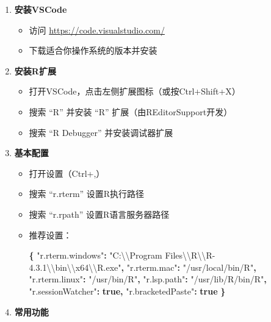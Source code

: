 \documentclass[
  twoside]{book}
\newenvironment{Shaded}{\begin{snugshade}}{\end{snugshade}}
\newcommand{\CharTok}[1]{\textcolor[rgb]{0.31,0.60,0.02}{#1}}
\newcommand{\DataTypeTok}[1]{\textcolor[rgb]{0.13,0.29,0.53}{#1}}
\newcommand{\FunctionTok}[1]{\textcolor[rgb]{0.13,0.29,0.53}{\textbf{#1}}}
\newcommand{\KeywordTok}[1]{\textcolor[rgb]{0.13,0.29,0.53}{\textbf{#1}}}
\newcommand{\StringTok}[1]{\textcolor[rgb]{0.31,0.60,0.02}{#1}}
\providecommand{\tightlist}{%
  \setlength{\itemsep}{0pt}\setlength{\parskip}{0pt}}
\begin{document}
\begin{enumerate}
\def\labelenumi{\arabic{enumi}.}
\tightlist
\item
  \textbf{安装VSCode}

  \begin{itemize}
  \tightlist
  \item
    访问 \url{https://code.visualstudio.com/}
  \item
    下载适合你操作系统的版本并安装
  \end{itemize}
\item
  \textbf{安装R扩展}

  \begin{itemize}
  \tightlist
  \item
    打开VSCode，点击左侧扩展图标（或按Ctrl+Shift+X）
  \item
    搜索 ``R'' 并安装 ``R'' 扩展（由REditorSupport开发）
  \item
    搜索 ``R Debugger'' 并安装调试器扩展
  \end{itemize}
\item
  \textbf{基本配置}

  \begin{itemize}
  \item
    打开设置（Ctrl+,）
  \item
    搜索 ``r.rterm'' 设置R执行路径
  \item
    搜索 ``r.rpath'' 设置R语言服务器路径
  \item
    推荐设置：

\begin{Shaded}
\begin{Highlighting}[]
\FunctionTok{\{}
  \DataTypeTok{"r.rterm.windows"}\FunctionTok{:} \StringTok{"C:}\CharTok{\textbackslash{}\textbackslash{}}\StringTok{Program Files}\CharTok{\textbackslash{}\textbackslash{}}\StringTok{R}\CharTok{\textbackslash{}\textbackslash{}}\StringTok{R{-}4.3.1}\CharTok{\textbackslash{}\textbackslash{}}\StringTok{bin}\CharTok{\textbackslash{}\textbackslash{}}\StringTok{x64}\CharTok{\textbackslash{}\textbackslash{}}\StringTok{R.exe"}\FunctionTok{,}
  \DataTypeTok{"r.rterm.mac"}\FunctionTok{:} \StringTok{"/usr/local/bin/R"}\FunctionTok{,}
  \DataTypeTok{"r.rterm.linux"}\FunctionTok{:} \StringTok{"/usr/bin/R"}\FunctionTok{,}
  \DataTypeTok{"r.lsp.path"}\FunctionTok{:} \StringTok{"/usr/lib/R/bin/R"}\FunctionTok{,}
  \DataTypeTok{"r.sessionWatcher"}\FunctionTok{:} \KeywordTok{true}\FunctionTok{,}
  \DataTypeTok{"r.bracketedPaste"}\FunctionTok{:} \KeywordTok{true}
\FunctionTok{\}}
\end{Highlighting}
\end{Shaded}
  \end{itemize}
\item
  \textbf{常用功能}


\end{enumerate}
\end{document}
